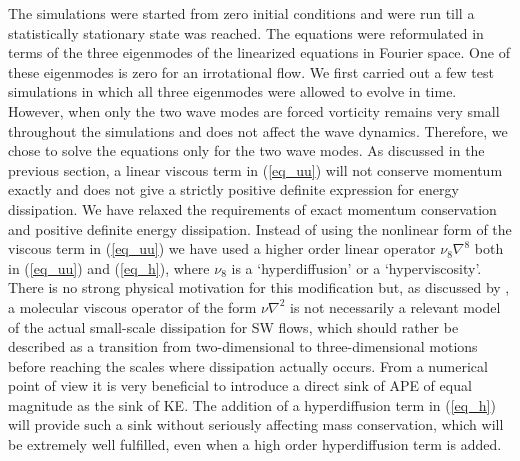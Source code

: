 \documentclass{jfm}
\begin{document}
The simulations were started from zero initial
conditions and were run till a statistically stationary state was reached. The
equations were reformulated in terms of the three eigenmodes of the linearized
equations in Fourier space. One of these eigenmodes is zero for an irrotational
flow. We first carried out a few test simulations in which all three eigenmodes
were allowed to evolve in time. However, when only the two wave modes are
forced vorticity remains very small throughout the simulations and does not
affect the wave dynamics. Therefore, we chose to solve the equations only for
the two wave modes. As discussed in the previous section, a linear viscous term
in (\ref{eq_uu}) will not conserve momentum exactly and does not give a
strictly positive definite expression for energy dissipation. We have relaxed
the requirements of exact momentum conservation and positive definite energy
dissipation. Instead of using the nonlinear form of the viscous term in
(\ref{eq_uu}) we have used a higher order linear operator $ \nu_8 \nabla^{8} $
both in (\ref{eq_uu}) and (\ref{eq_h}), where $ \nu_8 $ is a `hyperdiffusion'
or a `hyperviscosity'. There is no strong physical motivation for this
modification but, as discussed by \cite{FargeSadourny1989}, a molecular viscous
operator of the form $\nu \nabla^2 $ is not necessarily a relevant model of the
actual small-scale dissipation for SW flows, which should rather be described
as a transition from two-dimensional to three-dimensional motions before
reaching the scales where dissipation actually occurs.
From a numerical point of view it is very beneficial to introduce a direct sink of APE of equal magnitude as the sink of KE.
The addition of a hyperdiffusion term in (\ref{eq_h}) will provide such a sink without seriously affecting mass conservation, which will be 
extremely well fulfilled, even when a high order hyperdiffusion term is added. 
\end{document}
